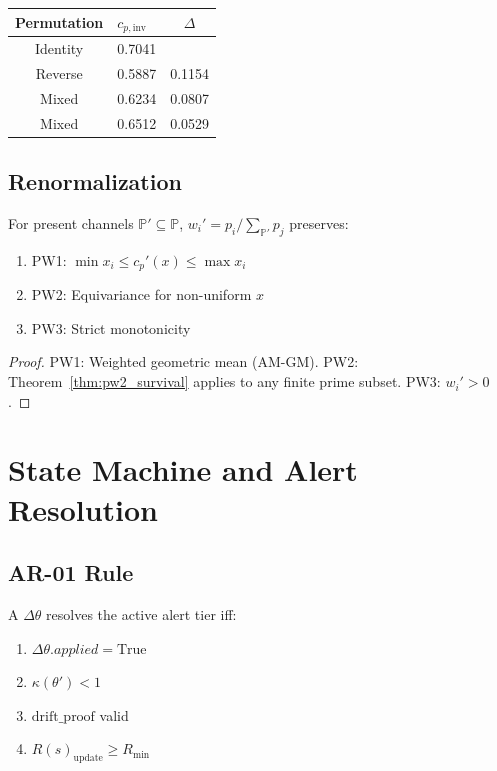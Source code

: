 \documentclass[11pt]{article}
\begin{document}
\begin{table}[h]
\centering
\begin{tabular}{@{}clc@{}}
\toprule
Permutation & $c_{p,\text{inv}}$ & $\Delta$ \\
\midrule
Identity & 0.7041 & \\
Reverse  & 0.5887 & 0.1154 \\
Mixed    & 0.6234 & 0.0807 \\
Mixed    & 0.6512 & 0.0529 \\
\bottomrule
\end{tabular}
\end{table}

\subsection{Renormalization}

\begin{theorem}
\label{thm:renormalization}
For present channels $\mathbb{P}' \subseteq \mathbb{P}$, $w_i' = p_i / \sum_{\mathbb{P}'} p_j$ preserves:
\begin{enumerate}
\item PW1: $\min x_i \le c_p'(x) \le \max x_i$
\item PW2: Equivariance for non-uniform $x$
\item PW3: Strict monotonicity
\end{enumerate}
\end{theorem}

\begin{proof}
PW1: Weighted geometric mean (AM-GM). PW2: Theorem~\ref{thm:pw2_survival} applies to any finite prime subset. PW3: $w_i' > 0$.
\end{proof}

\section{State Machine and Alert Resolution}

\subsection{AR-01 Rule}

\begin{definition}[AR-01]
A $\Delta\theta$ resolves the active alert tier iff:
\begin{enumerate}
\item $\Delta\theta.applied = \text{True}$
\item $\kappa(\theta') < 1$
\item $\text{drift\_proof}$ valid
\item $R(s)_{\text{update}} \ge R_{\min}$
\end{enumerate}
\end{definition}
\end{document}
